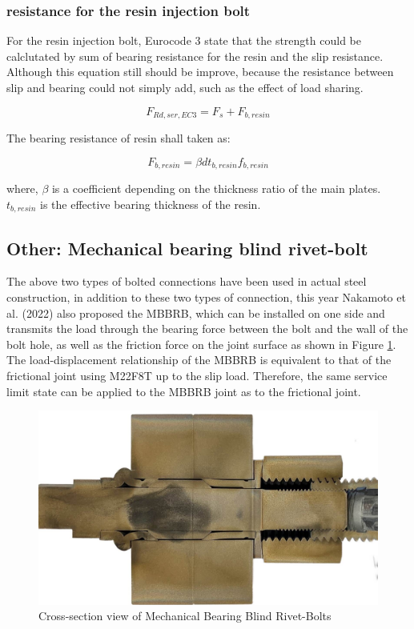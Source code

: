 \subsubsection{resistance for the resin injection bolt}

For the resin injection bolt, Eurocode 3 state that the strength could be calclutated by sum of 
bearing resistance for the resin and the slip resistance. Although this equation still should be improve, because the resistance between slip and bearing could not simply add, such as the effect of load sharing.


\begin{equation}
    F_{Rd,ser,EC3}=F_s+F_{b,resin}
\end{equation}   

The bearing resistance of resin shall taken as:

\begin{equation}
    F_{b,resin}=\beta dt_{b,resin}f_{b,resin}
\end{equation}

where, $\beta$ is a coefficient depending on the thickness ratio of the main plates. $t_{b,resin}$ is the effective bearing thickness of the resin. 


\subsection{Other: Mechanical bearing blind rivet-bolt}

The above two types of bolted connections have been used in actual steel construction, in addition to these two types of connection, this year Nakamoto et al. (2022) \cite{Nakamoto2022MBBRB} also proposed the \ac{MBBRB}, which can be installed on one side and transmits the load through the bearing force between the bolt and the wall of the bolt hole, as well as the friction force on the joint surface as shown in Figure \ref{fig-MBBRB}. The load-displacement relationship of the \ac{MBBRB} is equivalent to that of the frictional joint using M22F8T up to the slip load. Therefore, the same service limit state can be applied to the MBBRB joint as to the frictional joint.


\begin{figure}
    \centering
    \includegraphics[width=0.85\linewidth]{imgs//ch2/onesidebearingbolt.jpg}
    \caption{Cross-section view of Mechanical Bearing Blind Rivet-Bolts}
    \label{fig-MBBRB}
\end{figure}



